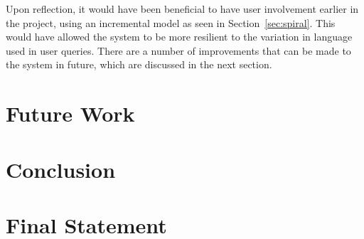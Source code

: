Upon reflection, it would have been beneficial to have user involvement earlier in the project, using an incremental model as seen in Section~\ref{sec:spiral}. This would have allowed the system to be more resilient to the variation in language used in user queries. There are a number of improvements that can be made to the system in future, which are discussed in the next section.

\section{Future Work}
\label{sec:future}


\section{Conclusion}
\section{Final Statement}
